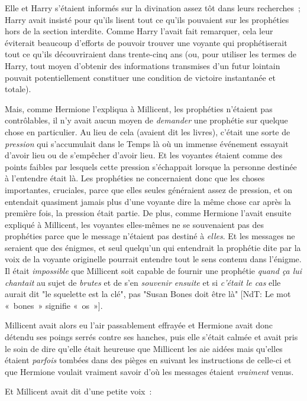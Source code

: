 Elle et Harry s'étaient informés sur la divination assez tôt dans leurs recherches~; Harry avait insisté pour qu'ils lisent tout ce qu'ils pouvaient sur les prophéties hors de la section interdite. Comme Harry l'avait fait remarquer, cela leur éviterait beaucoup d'efforts de pouvoir trouver une voyante qui prophétiserait tout ce qu'ils découvriraient dans trente-cinq ans (ou, pour utiliser les termes de Harry, tout moyen d'obtenir des informations transmises d'un futur lointain pouvait potentiellement constituer une condition de victoire instantanée et totale).

Mais, comme Hermione l'expliqua à Millicent, les prophéties n'étaient pas contrôlables, il n'y avait aucun moyen de \emph{demander} une prophétie sur quelque chose en particulier. Au lieu de cela (avaient dit les livres), c'était une sorte de \emph{pression} qui s'accumulait dans le Temps là où un immense événement essayait d'avoir lieu ou de s'empêcher d'avoir lieu. Et les voyantes étaient comme des points faibles par lesquels cette pression s'échappait lorsque la personne destinée à l'entendre était là. Les prophéties ne concernaient donc que les choses importantes, cruciales, parce que elles seules généraient assez de pression, et on entendait quasiment jamais plus d'une voyante dire la même chose car après la première fois, la pression était partie. De plus, comme Hermione l'avait ensuite expliqué à Millicent, les voyantes elles-mêmes ne se souvenaient pas des prophéties parce que le message n'étaient pas destiné à \emph{elles}. Et les messages ne seraient que des énigmes, et seul quelqu'un qui entendrait la prophétie dite par la voix de la voyante originelle pourrait entendre tout le sens contenu dans l'énigme. Il était \emph{impossible} que Millicent soit capable de fournir une prophétie \emph{quand ça lui chantait} au sujet de \emph{brutes} et de s'en \emph{souvenir ensuite} et si \emph{c'était le cas} elle aurait dit "le squelette est la clé", pas "Susan Bones doit être là" {[}NdT: Le mot «~bones~» signifie «~os~»{]}.

Millicent avait alors eu l'air passablement effrayée et Hermione avait donc détendu ses poings serrés contre ses hanches, puis elle s'était calmée et avait pris le soin de dire qu'elle était heureuse que Millicent les aie aidées mais qu'elles étaient \emph{parfois} tombées dans des pièges en suivant les instructions de celle-ci et que Hermione voulait vraiment savoir d'où les messages étaient \emph{vraiment} venus.

Et Millicent avait dit d'une petite voix~:

